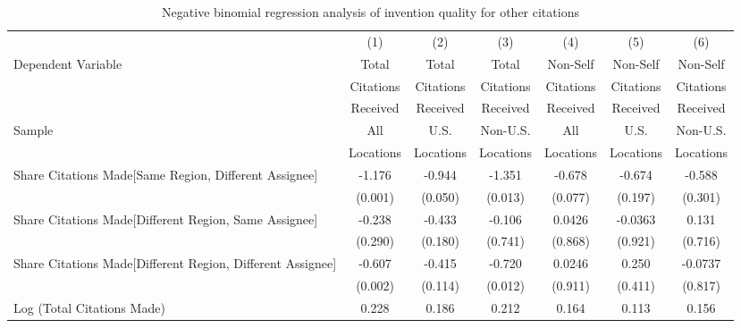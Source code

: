 \begin{table}[htbp]\centering
\caption{Negative binomial regression analysis of invention quality for other citations \label{o.model123192021}}
\small
\onehalfspacing
\begin{adjustbox}{angle=90}
\begin{tabular}{l*{6}{c}}
\hline\hline
                &\multicolumn{1}{c}{(1)}&\multicolumn{1}{c}{(2)}&\multicolumn{1}{c}{(3)}&\multicolumn{1}{c}{(4)}&\multicolumn{1}{c}{(5)}&\multicolumn{1}{c}{(6)}\\
 \multirow{3}{*}{Dependent Variable} &\multicolumn{1}{c}{Total}&\multicolumn{1}{c}{Total}&\multicolumn{1}{c}{Total}&\multicolumn{1}{c}{Non-Self}&\multicolumn{1}{c}{Non-Self}&\multicolumn{1}{c}{Non-Self}\\
                &\multicolumn{1}{c}{Citations}&\multicolumn{1}{c}{Citations}&\multicolumn{1}{c}{Citations}&\multicolumn{1}{c}{Citations}&\multicolumn{1}{c}{Citations}&\multicolumn{1}{c}{Citations}\\
                 &\multicolumn{1}{c}{Received}&\multicolumn{1}{c}{Received}&\multicolumn{1}{c}{Received}&\multicolumn{1}{c}{Received}&\multicolumn{1}{c}{Received}&\multicolumn{1}{c}{Received}\\
                 \hline
 \multirow{2}{*}{Sample}&\multicolumn{1}{c}{All}&\multicolumn{1}{c}{U.S.}&\multicolumn{1}{c}{Non-U.S.}&\multicolumn{1}{c}{All}&\multicolumn{1}{c}{U.S.}&\multicolumn{1}{c}{Non-U.S.}\\       
  &\multicolumn{1}{c}{Locations}&\multicolumn{1}{c}{Locations}&\multicolumn{1}{c}{Locations}&\multicolumn{1}{c}{Locations}&\multicolumn{1}{c}{Locations}&\multicolumn{1}{c}{Locations}\\        
\hline
Share Citations Made[Same Region, Different Assignee]&   -1.176&   -0.944&   -1.351&   -0.678&   -0.674&   -0.588\\
                &  (0.001)&  (0.050)&  (0.013)&  (0.077)&  (0.197)&  (0.301)\\
Share Citations Made[Different Region, Same Assignee]&   -0.238&   -0.433&   -0.106&   0.0426&  -0.0363&    0.131\\
                &  (0.290)&  (0.180)&  (0.741)&  (0.868)&  (0.921)&  (0.716)\\
Share Citations Made[Different Region, Different Assignee]&   -0.607&   -0.415&   -0.720&   0.0246&    0.250&  -0.0737\\
                &  (0.002)&  (0.114)&  (0.012)&  (0.911)&  (0.411)&  (0.817)\\
Log (Total Citations Made)&    0.228&    0.186&    0.212&    0.164&    0.113&    0.156\\

\end{tabular}
\end{adjustbox}
\end{table}

